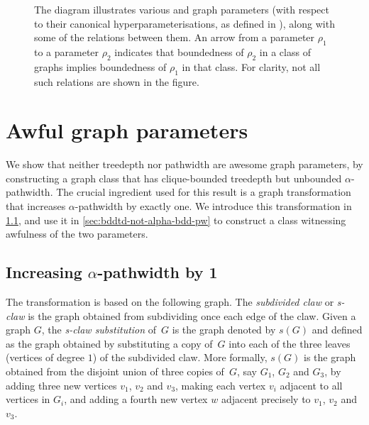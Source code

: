 \documentclass[11pt]{article}
\newcommand{\s}{s}
\theoremstyle{plain}
\theoremstyle{definition}
\theoremstyle{remark}
\numberwithin{equation}{section}
\begin{document}
\begin{figure}[ht]
{
    }
    \caption{The diagram illustrates various  and  graph parameters (with respect to their canonical hyperparameterisations, as defined in ), along with some of the relations between them. 
    An arrow from a parameter $\rho_1$ to a parameter $\rho_2$ indicates that boundedness of $\rho_2$ in a class of graphs implies boundedness of $\rho_1$ in that class. For clarity, not all such relations are shown in the figure.}
    \label{fig:graph-parameters}
\end{figure}

\section{Awful graph parameters}
\label{sec:td-pw}
We show that neither treedepth nor pathwidth are awesome graph parameters, by constructing a graph class that has clique-bounded treedepth but unbounded $\alpha$-pathwidth.
The crucial ingredient used for this result is a graph transformation that increases $\alpha$-pathwidth by exactly one.
We introduce this transformation in \cref{sec:alpha-pw}, and use it 
in \cref{sec:bddtd-not-alpha-bdd-pw} to construct a class witnessing awfulness of the two parameters.

\subsection{Increasing \texorpdfstring{$\alpha$}{α}-pathwidth by 1}\label{sec:alpha-pw}

The transformation is based on the following graph. The \emph{subdivided claw} or \emph{s-claw} is the graph obtained from subdividing once each edge of the claw.
Given a graph $G$, the \emph{s-claw substitution} of~$G$ is the graph denoted by $\s(G)$ and defined as the graph obtained by substituting a copy of~$G$ into each of the three leaves (vertices of degree $1$) of the subdivided claw.
More formally, $\s(G)$ is the graph obtained from the disjoint union of three copies of~$G$, say $G_1$, $G_2$ and $G_3$, by adding three new vertices $v_1$, $v_2$ and $v_3$, making each vertex $v_i$ adjacent to all vertices in $G_i$, and adding a fourth new vertex $w$ adjacent precisely to $v_1$, $v_2$ and~$v_3$.
\end{document}
